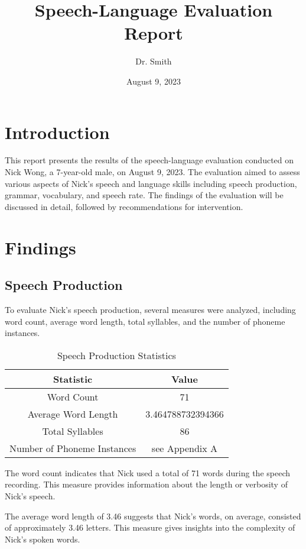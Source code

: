 \documentclass{article}
\title{Speech-Language Evaluation Report}
\author{Dr. Smith}
\date{August 9, 2023}
\begin{document}
\maketitle

\section{Introduction}

This report presents the results of the speech-language evaluation conducted on Nick Wong, a 7-year-old male, on August 9, 2023. The evaluation aimed to assess various aspects of Nick's speech and language skills including speech production, grammar, vocabulary, and speech rate. The findings of the evaluation will be discussed in detail, followed by recommendations for intervention.

\section{Findings}

\subsection{Speech Production}

To evaluate Nick's speech production, several measures were analyzed, including word count, average word length, total syllables, and the number of phoneme instances.

\begin{table}[H]
\centering
\caption{Speech Production Statistics}
\begin{tabular}{|c|c|}
\hline
\textbf{Statistic} & \textbf{Value} \\ \hline
Word Count & 71 \\ \hline
Average Word Length & 3.464788732394366 \\ \hline
Total Syllables & 86 \\ \hline
Number of Phoneme Instances & see Appendix A \\ \hline
\end{tabular}
\end{table}

The word count indicates that Nick used a total of 71 words during the speech recording. This measure provides information about the length or verbosity of Nick's speech. 

The average word length of 3.46 suggests that Nick's words, on average, consisted of approximately 3.46 letters. This measure gives insights into the complexity of Nick's spoken words.
\end{document}
